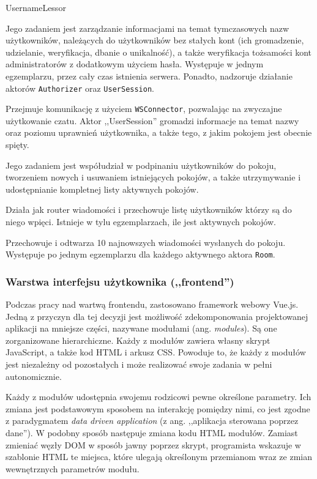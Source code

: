 \begin{labeling}{UsernameLessor}
  \item[\texttt{UsernameLessor}] Jego zadaniem jest zarządzanie informacjami na
  temat tymczasowych nazw użytkowników, należących do	użytkowników bez stałych
  kont (ich gromadzenie, udzielanie, weryfikacja, dbanie o unikalność), a także
  weryfikacja tożsamości kont administratorów z dodatkowym użyciem hasła.
  Występuje w jednym egzemplarzu, przez cały czas istnienia serwera. Ponadto,
  nadzoruje działanie aktorów \texttt{Authorizer} oraz \texttt{UserSession}.

  \item[\texttt{UserSession}] Przejmuje komunikację z użyciem
  \texttt{WSConnector}, pozwalając na zwyczajne użytkowanie czatu. Aktor
  ,,UserSession'' gromadzi informacje na temat nazwy oraz poziomu uprawnień
  użytkownika, a także tego, z jakim pokojem jest obecnie spięty.

  \item[\texttt{Landlord}] Jego zadaniem jest współudział w podpinaniu
  użytkowników do pokoju, tworzeniem nowych i usuwaniem istniejących pokojów, a
  także utrzymywanie i udostępnianie kompletnej listy aktywnych pokojów.

  \item[\texttt{Room}] Działa jak router wiadomości i przechowuje listę użytkowników którzy są do niego wpięci. Istnieje w tylu egzemplarzach, ile jest aktywnych pokojów.

  \item[\texttt{MessageCache}] Przechowuje i odtwarza 10 najnowszych wiadomości wysłanych do pokoju. Występuje po jednym egzemplarzu dla każdego aktywnego aktora \texttt{Room}.

\end{labeling}

\newpage

\subsubsection{Warstwa interfejsu użytkownika (,,frontend'')}
Podczas pracy nad wartwą frontendu, zastosowano framework webowy Vue.js. Jedną
z przyczyn dla tej decyzji jest możliwość zdekomponowania projektowanej aplikacji na mniejsze części, nazywane modułami (ang. \textit{modules}). Są one zorganizowane hierarchiczne. Każdy z modułów zawiera własny skrypt JavaScript, a także kod HTML i arkusz CSS. Powoduje to, że każdy z modułów jest niezależny od pozostałych i może realizować swoje zadania w pełni autonomicznie.

Każdy z modułów udostępnia swojemu rodzicowi pewne określone parametry. Ich zmiana
jest podstawowym sposobem na interakcję pomiędzy nimi, co jest zgodne z
paradygmatem \textit{data driven application} (z ang. ,,aplikacja sterowana
poprzez dane''). W podobny sposób następuje zmiana kodu HTML modułów. Zamiast
zmieniać węzły DOM w sposób jawny poprzez skrypt, programista wskazuje w
szablonie HTML te miejsca, które ulegają określonym przemianom wraz ze
zmian wewnętrznych parametrów modułu.

